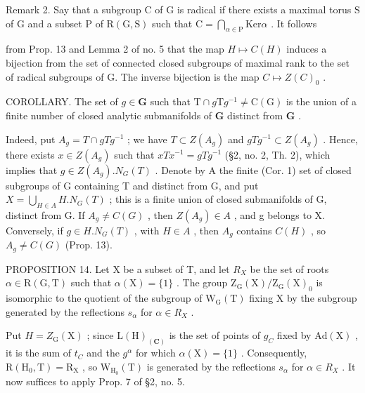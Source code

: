 Remark 2. Say that a subgroup \(\mathrm{C}\) of \(\mathrm{G}\) is radical if there exists a maximal torus \(\mathrm{S}\) of \(\mathrm{G}\) and a subset \(\mathrm{P}\) of \(\mathrm{R}(\mathrm{G},\mathrm{S})\) such that \(\mathrm{C} = \bigcap_{\alpha \in \mathrm{P}}\mathrm{Ker}\alpha\) . It follows

from Prop. 13 and Lemma 2 of no. 5 that the map \(H \mapsto C(H)\) induces a bijection from the set of connected closed subgroups of maximal rank to the set of radical subgroups of G. The inverse bijection is the map \(C \mapsto Z(C)_{0}\) .

COROLLARY. The set of \(g \in \mathbf{G}\) such that \(\mathrm{T} \cap g\mathrm{T}g^{-1} \neq \mathrm{C}(\mathrm{G})\) is the union of a finite number of closed analytic submanifolds of \(\mathbf{G}\) distinct from \(\mathbf{G}\) .

Indeed, put \(A_{g} = T \cap gTg^{-1}\) ; we have \(T \subset Z(A_{g})\) and \(gTg^{-1} \subset Z(A_{g})\) . Hence, there exists \(x \in Z(A_{g})\) such that \(xTx^{-1} = gTg^{-1}\) (§2, no. 2, Th. 2), which implies that \(g \in Z(A_{g}).N_{G}(T)\) . Denote by A the finite (Cor. 1) set of closed subgroups of G containing T and distinct from G, and put \(X = \bigcup_{H \in A} H.N_{G}(T)\) ; this is a finite union of closed submanifolds of G, distinct from G. If \(A_{g} \neq C(G)\) , then \(Z(A_{g}) \in A\) , and g belongs to X. Conversely, if \(g \in H.N_{G}(T)\) , with \(H \in A\) , then \(A_{g}\) contains \(C(H)\) , so \(A_{g} \neq C(G)\) (Prop. 13).

PROPOSITION 14. Let X be a subset of T, and let \(R_{X}\) be the set of roots \(\alpha \in \mathrm{R}(\mathrm{G}, \mathrm{T})\) such that \(\alpha(\mathrm{X}) = \{1\}\) . The group \(\mathrm{Z}_{\mathrm{G}}(\mathrm{X}) / \mathrm{Z}_{\mathrm{G}}(\mathrm{X})_{0}\) is isomorphic to the quotient of the subgroup of \(\mathrm{W}_{\mathrm{G}}(\mathrm{T})\) fixing X by the subgroup generated by the reflections \(s_{\alpha}\) for \(\alpha \in R_{X}\) .

Put \(H = Z_{\mathrm{G}}(\mathrm{X})\) ; since \(\mathrm{L}(\mathrm{H})_{(\mathbf{C})}\) is the set of points of \(g_{C}\) fixed by \(\mathrm{Ad}(\mathrm{X})\) , it is the sum of \(t_{C}\) and the \(g^{\alpha}\) for which \(\alpha(\mathrm{X}) = \{1\}\) . Consequently, \(\mathrm{R}(\mathrm{H}_{0}, \mathrm{T}) = \mathrm{R}_{\mathrm{X}}\) , so \(\mathrm{W}_{\mathrm{H}_{0}}(\mathrm{T})\) is generated by the reflections \(s_{\alpha}\) for \(\alpha \in R_{X}\) . It now suffices to apply Prop. 7 of §2, no. 5.

